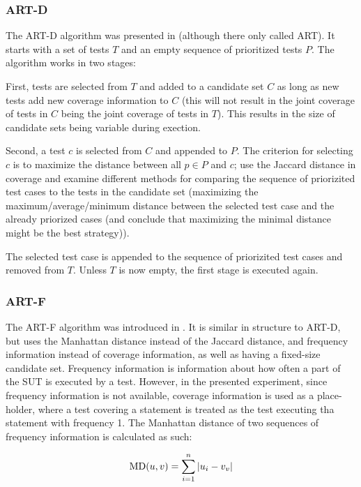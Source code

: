 \subsubsection{ART-D}

The ART-D algorithm was presented in \cite{jiang2009adaptive} (although
there only called ART). It starts with a set of tests $T$ and an empty
sequence of prioritized tests $P$. The algorithm works in two stages:

First, tests are selected from $T$ and added to a candidate set $C$
as long as new tests add new coverage information to $C$ (this will not
result in the joint coverage of tests in $C$ being the joint coverage of
tests in $T$). This results in the size of candidate sets being variable
during exection.

Second, a test $c$ is selected from $C$ and appended to $P$. The
criterion for selecting $c$ is to maximize the distance between all $p
\in P$ and $c$; \cite{jiang2009adaptive} use the Jaccard distance in
coverage and examine different methods for comparing the sequence of
priorizited test cases to the tests in the candidate set (maximizing
the maximum/average/minimum distance between the selected test case and
the already priorized cases (and conclude that maximizing the minimal
distance might be the best strategy)).

The selected test case is appended to the sequence of priorizited test
cases and removed from $T$. Unless $T$ is now empty, the first stage is
executed again.

\subsubsection{ART-F}

The ART-F algorithm was introduced in \cite{zhou2012fault}. It
is similar in structure to ART-D, but uses the Manhattan distance
instead of the Jaccard distance, and frequency information instead
of coverage information, as well as having a fixed-size candidate
set. Frequency information is information about how often a part of the
SUT is executed by a test. However, in the presented experiment, since
frequency information is not available, coverage information is used as
a place-holder, where a test covering a statement is treated as the test
executing tha statement with frequency 1. The Manhattan distance of two
sequences of frequency information is calculated as such:

$$\hbox{MD}(u, v)=\sum_{i=1}^{n}|u_i-v_v|$$

